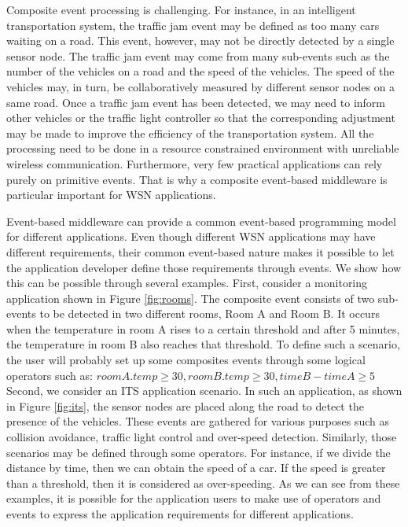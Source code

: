 Composite event processing is challenging. For instance, in an intelligent transportation system, the traffic jam event may be defined as too many cars waiting on a road. This event, however, may not be directly detected by a single sensor node. The traffic jam event may come from many sub-events such as the number of the vehicles on a road and the speed of the vehicles. The speed of the vehicles may, in turn, be collaboratively measured by different sensor nodes on a same road. Once a traffic jam event has been detected, we may need to inform other vehicles or the traffic light controller so that the corresponding adjustment may be made to improve the efficiency of the transportation system. All the processing need to be done in a resource constrained environment with unreliable wireless communication. Furthermore, very few practical applications can rely purely on primitive events. That is why a composite event-based middleware is particular important for WSN applications.

Event-based middleware can provide a common event-based programming model for different applications. Even though different WSN applications may have different requirements, their common event-based nature makes it possible to let the application developer define those requirements through events. We show how this can be possible through several examples. First, consider a monitoring application shown in Figure \ref{fig:rooms}. The composite event consists of two sub-events to be detected in two different rooms, Room A and Room B. It occurs when the temperature in room A rises to a certain threshold and after 5 minutes, the temperature in room B also reaches that threshold. To define such a scenario, the user will probably set up some composites events through some logical operators such as: \(roomA.temp \geq 30, roomB.temp \geq 30, timeB - timeA \geq 5\) Second, we consider an ITS application scenario. In such an application, as shown in Figure \ref{fig:its}, the sensor nodes are placed along the road to detect the presence of the vehicles. These events are gathered for various purposes such as collision avoidance, traffic light control and over-speed detection. Similarly, those scenarios may be defined through some operators. For instance, if we divide the distance by time, then we can obtain the speed of a car. If the speed is greater than a threshold, then it is considered as over-speeding. As we can see from these examples, it is possible for the application users to make use of operators and events to express the application requirements for different applications.

